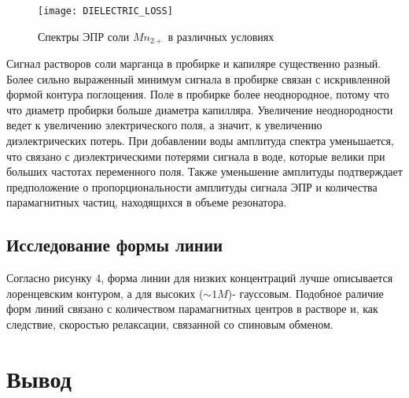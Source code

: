 \documentclass[a4paper,12pt]{article}
\begin{document}
	
 	\begin{figure}[H]
		\begin{center}
			\texttt{[image: DIELECTRIC\_LOSS]}
			\caption{Спектры ЭПР соли $Mn_{2+}$ в различных условиях}
		\end{center}
	\end{figure}
	
	
	
	Сигнал растворов соли марганца в пробирке и капиляре существенно разный. Более сильно выраженный минимум сигнала в пробирке связан с искривленной формой контура поглощения. Поле в пробирке более неоднородное, потому что что диаметр пробирки больше диаметра капилляра. Увеличение неоднородности ведет к увеличению электрического поля, а значит, к увеличению диэлектрических потерь. При добавлении воды амплитуда спектра уменьшается, что связано с диэлектрическими потерями сигнала в воде, которые велики при больших частотах переменного поля. Также уменьшение амплитуды подтверждает предположение о пропорциональности амплитуды сигнала ЭПР и количества парамагнитных частиц, находящихся в объеме резонатора.
	
	
	\subsection{Исследование формы линии}
	
	Согласно рисунку 4, форма линии для низких концентраций лучше описывается лоренцевским контуром, а для высоких ($\sim1 M$)- гауссовым. Подобное раличие форм линий связано с количеством парамагнитных центров в растворе и, как следствие, скоростью релаксации, связанной со спиновым обменом.
	
	
	\section{Вывод}
	
\end{document}
